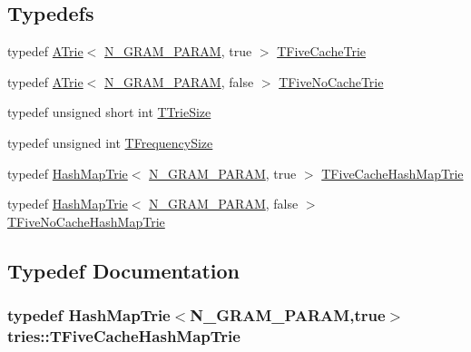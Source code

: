 \subsection*{Typedefs}
\begin{DoxyCompactItemize}
\item 
typedef \hyperlink{classtries_1_1_a_trie}{A\+Trie}$<$ \hyperlink{_globals_8hpp_a5f3826bb70e91d12acce8d68c346c07b}{N\+\_\+\+G\+R\+A\+M\+\_\+\+P\+A\+R\+A\+M}, true $>$ \hyperlink{namespacetries_a8b71e593af4a9a80282f1fa85d7f8255}{T\+Five\+Cache\+Trie}
\item 
typedef \hyperlink{classtries_1_1_a_trie}{A\+Trie}$<$ \hyperlink{_globals_8hpp_a5f3826bb70e91d12acce8d68c346c07b}{N\+\_\+\+G\+R\+A\+M\+\_\+\+P\+A\+R\+A\+M}, false $>$ \hyperlink{namespacetries_adc3f42d6b717a7d2a34ad0d90c028a00}{T\+Five\+No\+Cache\+Trie}
\item 
typedef unsigned short int \hyperlink{namespacetries_a621e8987880c3e13fa029a65336b920c}{T\+Trie\+Size}
\item 
typedef unsigned int \hyperlink{namespacetries_a3eaf32cf4423e228789e4387cd912d2a}{T\+Frequency\+Size}
\item 
typedef \hyperlink{classtries_1_1_hash_map_trie}{Hash\+Map\+Trie}$<$ \hyperlink{_globals_8hpp_a5f3826bb70e91d12acce8d68c346c07b}{N\+\_\+\+G\+R\+A\+M\+\_\+\+P\+A\+R\+A\+M}, true $>$ \hyperlink{namespacetries_a0d8fcb4509e845f8686ffa270e347fe0}{T\+Five\+Cache\+Hash\+Map\+Trie}
\item 
typedef \hyperlink{classtries_1_1_hash_map_trie}{Hash\+Map\+Trie}$<$ \hyperlink{_globals_8hpp_a5f3826bb70e91d12acce8d68c346c07b}{N\+\_\+\+G\+R\+A\+M\+\_\+\+P\+A\+R\+A\+M}, false $>$ \hyperlink{namespacetries_ae939879f99b16d403aacda01ec1adf42}{T\+Five\+No\+Cache\+Hash\+Map\+Trie}
\end{DoxyCompactItemize}


\subsection{Typedef Documentation}
\hypertarget{namespacetries_a0d8fcb4509e845f8686ffa270e347fe0}{}
\subsubsection[{T\+Five\+Cache\+Hash\+Map\+Trie}]{\setlength{\rightskip}{0pt plus 5cm}typedef {\bf Hash\+Map\+Trie}$<${\bf N\+\_\+\+G\+R\+A\+M\+\_\+\+P\+A\+R\+A\+M},true$>$ {\bf tries\+::\+T\+Five\+Cache\+Hash\+Map\+Trie}}\label{namespacetries_a0d8fcb4509e845f8686ffa270e347fe0}


